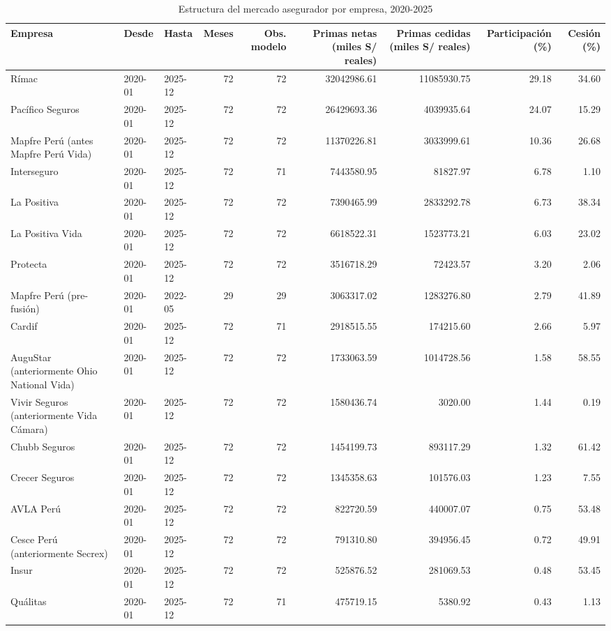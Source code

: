\begin{table}[htbp]
\caption{Estructura del mercado asegurador por empresa, 2020-2025}
\label{tab:tabla_2_empresas}
\begin{tabular}{lllrrrrrr}
\toprule
Empresa & Desde & Hasta & Meses & Obs. modelo & Primas netas (miles S/ reales) & Primas cedidas (miles S/ reales) & Participación (\%) & Cesión (\%) \\
\midrule
Rímac & 2020-01 & 2025-12 & 72 & 72 & 32042986.61 & 11085930.75 & 29.18 & 34.60 \\
Pacífico Seguros & 2020-01 & 2025-12 & 72 & 72 & 26429693.36 & 4039935.64 & 24.07 & 15.29 \\
Mapfre Perú (antes Mapfre Perú Vida) & 2020-01 & 2025-12 & 72 & 72 & 11370226.81 & 3033999.61 & 10.36 & 26.68 \\
Interseguro & 2020-01 & 2025-12 & 72 & 71 & 7443580.95 & 81827.97 & 6.78 & 1.10 \\
La Positiva & 2020-01 & 2025-12 & 72 & 72 & 7390465.99 & 2833292.78 & 6.73 & 38.34 \\
La Positiva Vida & 2020-01 & 2025-12 & 72 & 72 & 6618522.31 & 1523773.21 & 6.03 & 23.02 \\
Protecta & 2020-01 & 2025-12 & 72 & 72 & 3516718.29 & 72423.57 & 3.20 & 2.06 \\
Mapfre Perú (pre-fusión) & 2020-01 & 2022-05 & 29 & 29 & 3063317.02 & 1283276.80 & 2.79 & 41.89 \\
Cardif & 2020-01 & 2025-12 & 72 & 71 & 2918515.55 & 174215.60 & 2.66 & 5.97 \\
AuguStar (anteriormente Ohio National Vida) & 2020-01 & 2025-12 & 72 & 72 & 1733063.59 & 1014728.56 & 1.58 & 58.55 \\
Vivir Seguros (anteriormente Vida Cámara) & 2020-01 & 2025-12 & 72 & 72 & 1580436.74 & 3020.00 & 1.44 & 0.19 \\
Chubb Seguros & 2020-01 & 2025-12 & 72 & 72 & 1454199.73 & 893117.29 & 1.32 & 61.42 \\
Crecer Seguros & 2020-01 & 2025-12 & 72 & 72 & 1345358.63 & 101576.03 & 1.23 & 7.55 \\
AVLA Perú & 2020-01 & 2025-12 & 72 & 72 & 822720.59 & 440007.07 & 0.75 & 53.48 \\
Cesce Perú (anteriormente Secrex) & 2020-01 & 2025-12 & 72 & 72 & 791310.80 & 394956.45 & 0.72 & 49.91 \\
Insur & 2020-01 & 2025-12 & 72 & 72 & 525876.52 & 281069.53 & 0.48 & 53.45 \\
Quálitas & 2020-01 & 2025-12 & 72 & 71 & 475719.15 & 5380.92 & 0.43 & 1.13 \\

\end{tabular}
\end{table}
